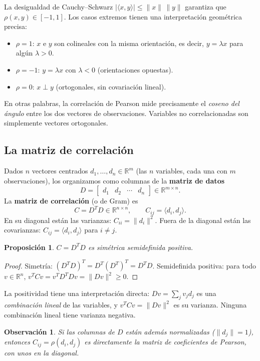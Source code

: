 \documentclass[12pt]{article}
\newtheorem{proposition}[theorem]{Proposición}
\newtheorem{remark}[theorem]{Observación}
\newcommand{\R}{\mathbb{R}}
\begin{document}
La desigualdad de Cauchy--Schwarz $|\langle x, y \rangle| \leq \|x\|\,\|y\|$ garantiza que $\rho(x,y) \in [-1, 1]$. Los casos extremos tienen una interpretación geométrica precisa:
\begin{itemize}
  \item $\rho = 1$: $x$ e $y$ son colineales con la misma orientación, es decir, $y = \lambda x$ para algún $\lambda > 0$.
  \item $\rho = -1$: $y = \lambda x$ con $\lambda < 0$ (orientaciones opuestas).
  \item $\rho = 0$: $x \perp y$ (ortogonales, sin covariación lineal).
\end{itemize}
En otras palabras, la correlación de Pearson mide precisamente el \emph{coseno del ángulo} entre los dos vectores de observaciones. Variables no correlacionadas son simplemente vectores ortogonales.

\subsection{La matriz de correlación}

Dados $n$ vectores centrados $d_1, \ldots, d_n \in \R^m$ (las $n$ variables, cada una con $m$ observaciones), los organizamos como columnas de la \textbf{matriz de datos}
\[
  D = \begin{bmatrix} d_1 & d_2 & \cdots & d_n \end{bmatrix} \in \R^{m \times n}.
\]
La \textbf{matriz de correlación} (o de Gram) es
\[
  C = D^T D \in \R^{n \times n}, \qquad C_{ij} = \langle d_i, d_j \rangle.
\]
En su diagonal están las varianzas: $C_{ii} = \|d_i\|^2$. Fuera de la diagonal están las covarianzas: $C_{ij} = \langle d_i, d_j\rangle$ para $i \neq j$.

\begin{proposition}
$C = D^TD$ es simétrica semidefinida positiva.
\end{proposition}
\begin{proof}
Simetría: $(D^TD)^T = D^T(D^T)^T = D^TD$. Semidefinida positiva: para todo $v \in \R^n$,
$v^T C v = v^T D^T D v = \|Dv\|^2 \geq 0.$
\end{proof}

La positividad tiene una interpretación directa: $Dv = \sum_j v_j d_j$ es una \emph{combinación lineal} de las variables, y $v^TCv = \|Dv\|^2$ es su varianza. Ninguna combinación lineal tiene varianza negativa.

\begin{remark}
Si las columnas de $D$ están además normalizadas ($\|d_j\| = 1$), entonces $C_{ij} = \rho(d_i, d_j)$ es directamente la matriz de coeficientes de Pearson, con unos en la diagonal.
\end{remark}
\end{document}
